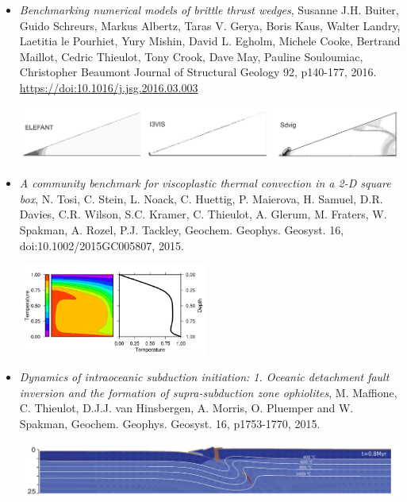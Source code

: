 \begin{itemize}
\item {\it Benchmarking numerical models of brittle thrust wedges}, 
Susanne J.H. Buiter, Guido Schreurs, Markus Albertz, Taras V. Gerya, Boris Kaus,
Walter Landry, Laetitia le Pourhiet, Yury Mishin, David L. Egholm, Michele Cooke,
Bertrand Maillot, Cedric Thieulot, Tony Crook, Dave May, Pauline Souloumiac, Christopher Beaumont
Journal of Structural Geology 92, p140-177, 2016. \url{https://doi:10.1016/j.jsg.2016.03.003}

\begin{center}
\includegraphics[height=1.8cm]{images/mycodes/busa16_img}
\end{center}


\item {\it A community benchmark for viscoplastic thermal convection in a 2-D square box}, 
N. Tosi, C. Stein, L. Noack, C. Huettig, P. Maierova, H. Samuel, D.R. Davies, C.R. Wilson, S.C. Kramer, C. Thieulot, A. Glerum, M. Fraters, W. Spakman, A. Rozel, P.J. Tackley, Geochem. Geophys. Geosyst. 16, doi:10.1002/2015GC005807, 2015.

\begin{center}
\includegraphics[height=3cm]{images/mycodes/tosn15_img}
\end{center}


\item {\it Dynamics of intraoceanic subduction initiation: 1. Oceanic detachment fault inversion and the formation of supra-subduction zone ophiolites}, M. Maffione, C. Thieulot, D.J.J. van Hinsbergen, A. Morris, O. Pluemper and W. Spakman, Geochem. Geophys. Geosyst. 16, p1753-1770, 2015.

\begin{center}
\includegraphics[height=1.8cm]{images/mycodes/matv15_img}
\end{center}


\end{itemize}
